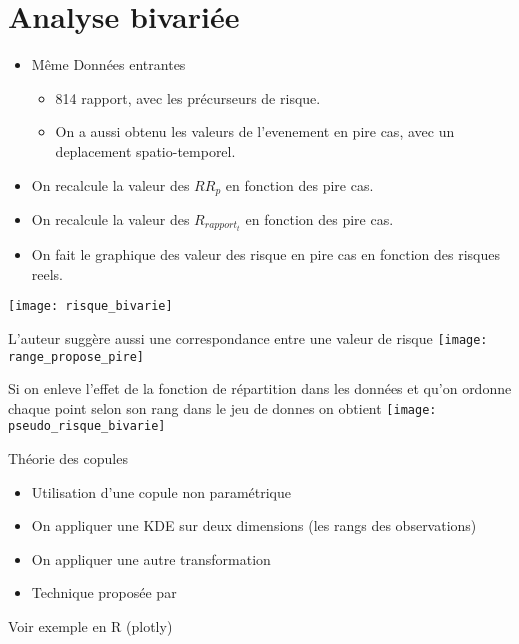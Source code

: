 \section{Analyse bivariée}

\begin{frame}
	\begin{itemize}
	\item Même Données entrantes
	
	\begin{itemize}
		\item 814 rapport, avec les précurseurs de risque. 
		\item On a aussi obtenu les valeurs de l'evenement en pire cas, avec un deplacement spatio-temporel.
	\end{itemize}	
	
	\item On recalcule la valeur des $RR_p$ en fonction des pire cas.
	\item On recalcule la valeur des $R_{rapport_t}$ en fonction des pire cas.
	\item On fait le graphique des valeur des risque en pire cas en fonction des risques reels.

	\end{itemize}

\end{frame}

\begin{frame}
	\texttt{[image: risque\_bivarie]}	
\end{frame}


\begin{frame}
	L'auteur suggère aussi une correspondance entre une valeur de risque 
	\texttt{[image: range\_propose\_pire]}	
\end{frame}


\begin{frame}
	Si on enleve l'effet de la fonction de répartition dans les données et qu'on ordonne chaque point selon son rang dans le jeu de donnes on obtient
	\texttt{[image: pseudo\_risque\_bivarie]}	
	
\end{frame}


\begin{frame}
	Théorie des copules
	\begin{itemize}
		\item Utilisation d'une copule non paramétrique
		\item On appliquer une KDE sur deux dimensions (les rangs des observations)
		\item On appliquer une autre transformation 
		\item Technique proposée par \cite{charpentier}
		
	\end{itemize}
	Voir exemple en R (plotly)
	
\end{frame}



